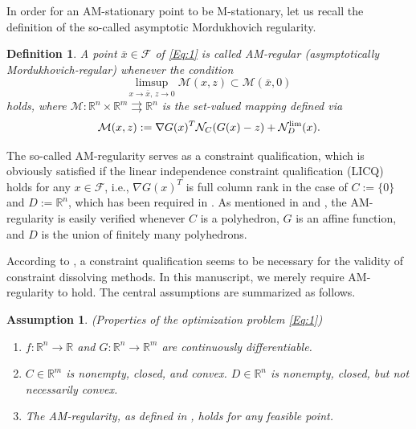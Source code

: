 \documentclass[11pt,a4paper,reqno]{amsart}
\newtheorem{definition}[theorem]{Definition}
\newtheorem{assumption}{Assumption}
\begin{document}
{In order for an AM-stationary point to be M-stationary, let us recall the definition of the so-called asymptotic Mordukhovich regularity.

\begin{definition}\label{Def:AsymptoticRegularity}
	A point $\bar x\in\mathcal F $ of \eqref{Eq:1} is called \emph{AM-regular}
	(asymptotically Mordukhovich-regular) whenever the condition
	\[
		\limsup\limits_{x\to \bar x,\,z\to 0}\mathcal M(x,z)
		\subset
		\mathcal M(\bar x,0)
	\]
	holds, where $\mathcal M\colon\mathbb{R}^n\times\mathbb{R}^m\rightrightarrows\mathbb{R}^n$ 
	is the set-valued mapping defined via
	\[
		\mathcal M(x,z)
		:=
		\nabla G(x)^T\mathcal N_C(G(x)-z)+\mathcal N_D^\textup{lim}(x).
	\]
\end{definition}

The so-called AM-regularity serves as a constraint qualification, which is obviously satisfied if the linear independence constraint qualification (LICQ) holds for any $x\in \mathcal F$, i.e., $\nabla G(x)^T$ is full column rank in the case of $C := \{0\}$ and $D := \mathbb{R}^n$, which has been required in \cite{xiao2024dissolving}. As mentioned in \cite[Lemma~2.8]{jia2023augmented} and \cite[Theorem~3.10, 5.2]{mehlitz2020asymptotic}, the AM-regularity is easily verified whenever $C$ is a polyhedron, $G$ is an affine function, and $D$ is the union of finitely many polyhedrons.

According to \cite{xiao2024dissolving, xiao2026exact}, a constraint qualification seems to be necessary for the validity of constraint dissolving methods. In this manuscript, we merely require AM-regularity to hold. The central assumptions are summarized as follows.

\begin{assumption}(Properties of the optimization problem \eqref{Eq:1})
\begin{enumerate}[label=(\alph*)] \label{Ass:2}
    \item \label{item:2a} $f:\mathbb R^n \to \mathbb R$ and $G:\mathbb R^n\to \mathbb R^m$ are continuously differentiable. 
    \item \label{item:2b} $C \in \mathbb R^m$ is nonempty, closed, and convex. $D\in \mathbb R^n$ is nonempty, closed, but not necessarily convex.
    \item \label{item:2c} The AM-regularity, as defined in , holds for any feasible point.
\end{enumerate}    
\end{assumption}


}
\end{document}
